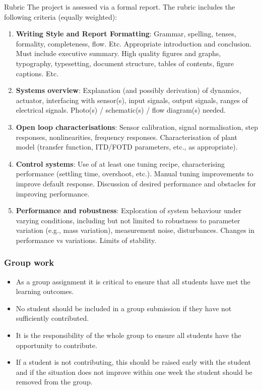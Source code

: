\documentclass[9pt]{beamer-control}
\begin{document}
\begin{frame}{Rubric}
  The project is assessed via a formal report. The rubric includes the following criteria (equally weighted):

  \small
  \begin{enumerate}
    \item \textbf{Writing Style and Report Formatting}:
      Grammar, spelling, tenses, formality, completeness, flow. Etc. Appropriate introduction and conclusion. Must include executive summary. High quality figures and graphs, typography, typesetting, document structure, tables of contents, figure captions. Etc.

    \item \textbf{Systems overview}:
      Explanation (and possibly derivation) of dynamics, actuator, interfacing with sensor(s), input signals, output signals, ranges of electrical signals. Photo(s) / schematic(s) / flow diagram(s) needed.

    \item \textbf{Open loop characterisations}:
      Sensor calibration, signal normalisation, step responses, nonlinearities, frequency responses. Characterisation of plant model (transfer function, ITD/FOTD parameters, etc., as appropriate).

    \item \textbf{Control systems}:
      Use of at least one tuning recipe, characterising performance (settling time, overshoot, etc.). Manual tuning improvements to improve default response. Discussion of desired performance and obstacles for improving performance.

    \item \textbf{Performance and robustness}:
      Exploration of system behaviour under varying conditions, including but not limited to robustness to parameter variation (e.g., mass variation), measurement noise, disturbances. Changes in performance vs variations. Limits of stability.
  \end{enumerate}
\end{frame}

\begin{frame}
  \frametitle{Group work}
  \begin{itemize}
    \item As a group assignment it is critical to ensure that all students have met the learning outcomes.
    \item No student should be included in a group submission if they have not sufficiently contributed.
    \item It is the responsibility of the whole group to ensure all students have the opportunity to contribute.
    \item If a student is not contributing, this should be raised early with the student and if the situation does not improve within one week the student should be removed from the group.
  \end{itemize}
\end{frame}
\end{document}
